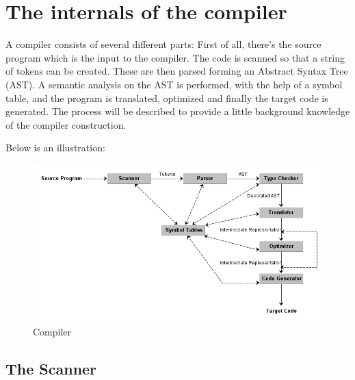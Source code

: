 \section{The internals of the compiler}

A compiler consists of several different parts: First of all, there's the source program which is the input to the compiler. The code is scanned so that a string of tokens can be created. These are then parsed forming an Abstract Syntax Tree (AST). A semantic analysis on the AST is performed, with the help of a symbol table, and the program is translated, optimized and finally the target code is generated. The process will be described to provide a little background knowledge of the compiler construction. 

Below is an illustration:

\begin{figure}[ht]
	\centering
		\includegraphics[scale = 0.5]{img/compiler.png}
	\caption{Compiler}
	\label{fig:compiler}
\end{figure}


\subsection{The Scanner}


